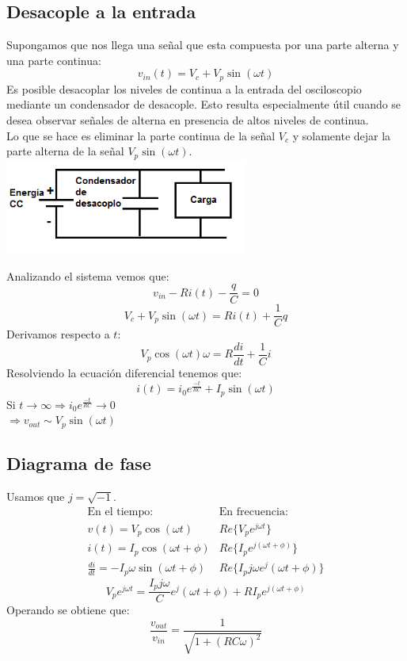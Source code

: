 \documentclass{report}
\begin{document}
\subsection{Desacople a la entrada}
Supongamos que nos llega una señal que esta compuesta por una parte alterna y una parte continua:
\[
	v_{in}(t) = V_c + V_p\sin(\omega t)
\]
Es posible desacoplar los niveles de continua a la entrada del osciloscopio mediante un condensador de desacople. Esto resulta especialmente útil cuando se desea observar señales de alterna en presencia de altos niveles de continua.\\
Lo que se hace es eliminar la parte continua de la señal \(V_c\) y solamente dejar la parte alterna de la señal \(V_p\sin(\omega t)\).\\
\includegraphics[width=8cm]{../Assets/condensador_desacople.png}

Analizando el sistema vemos que:
\[
	v_{in} - Ri(t) - \frac{q}{C} = 0
\]
\[
	V_c + V_p\sin(\omega t) = Ri(t) + \frac{1}{C}q
\]
Derivamos respecto a \(t\):
\[
	V_p\cos(\omega t)\omega = R\frac{di}{dt} + \frac{1}{C}i
\]
Resolviendo la ecuación diferencial tenemos que:
\[
	i(t) = i_0e^{\frac{-t}{RC}} + I_p\sin(\omega t)
\]
Si \(t \to \infty \Rightarrow i_0e^{\frac{-t}{RC}} \to 0\) \\
\(\Rightarrow v_{out} \sim V_p\sin(\omega t)\)

\subsection{Diagrama de fase} %
Usamos que \(j=\sqrt{-1}\).
\[
	\begin{array}{ll}
		\text{En el tiempo:}                            & \text{En frecuencia:}                \\ \hline
		v(t)= V_p\cos(\omega t)                         & Re\{V_pe^{j\omega t}\}               \\
		i(t) = I_p\cos(\omega t + \phi)                 & Re\{I_pe^{j(\omega t + \phi)}\}      \\
		\frac{di}{dt} = -I_p\omega\sin(\omega t + \phi) & Re\{I_pj\omega e^j(\omega t +\phi)\}
	\end{array}
\]
\[
	V_pe^{j\omega t} = \frac{I_pj\omega}{C}e^j(\omega t +\phi) + RI_pe^{j(\omega t + \phi)}
\]
Operando se obtiene que:
\[
	\frac{v_{out}}{v_{in}} = \frac{1}{\sqrt{1 + (RC\omega)^2}}
\]
\end{document}
